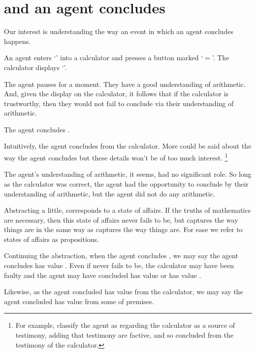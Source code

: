 \chapter{\qWhy{} and \qHow{} an agent concludes}
\label{cha:intro}

\begin{note}
  Our interest is understanding the way an event in which an agent concludes happens.

  \begin{scenario}[Calculation]%
    \label{scen:calc}%
    An agent enters `\gistCalcLHS{}' into a calculator and presses a button marked `\(=\)'.
    The calculator displays `\gistCalcRHS{}'.

    The agent pauses for a moment.
    They have a good understanding of arithmetic.
    And, given the display on the calculator, it follows that if the calculator is trustworthy, then they would not fail to conclude \propM{\gistCalcEq{}} via their understanding of arithmetic.

    The agent concludes \propM{\gistCalcEq{}}.
  \end{scenario}

  \noindent%
  Intuitively, the agent concludes \propM{\gistCalcEq{}} from the calculator.
  More could be said about the way the agent concludes but these details won't be of too much interest.%
  \footnote{
    For example, classify the agent as regarding the calculator as a source of testimony, adding that testimony are factive, and so concluded \propM{\gistCalcEq{}} from the testimony of the calculator.
  }

  The agent's understanding of arithmetic, it seems, had no significant role.
  So long as the calculator was correct, the agent had the opportunity to conclude \propM{\gistCalcEq{}} by their understanding of arithmetic, but the agent did not do any arithmetic.
\end{note}

\begin{note}
  Abstracting a little, \propM{\gistCalcEq{}} corresponds to a state of affairs.
  If the truths of mathematics are necessary, then this state of affairs never fails to be, but \propM{\gistCalcEq{}} captures the way things are in the same way as  captures the way things are.
  For ease we refer to states of affairs as propositions.

  Continuing the abstraction, when the agent concludes \propM{\gistCalcEq{}}, we may say the agent concludes \propM{\gistCalcEq{}} has value .
  Even if \propM{\gistCalcEq{}} never fails to be, the calculator may have been faulty and the agent may have concluded \propM{\gistCalcEqBad{}} has value  or \propM{\gistCalcEq{}} has value .

  Likewise, as the agent concluded \propM{\gistCalcEq{}} has value  from the calculator, we may say the agent concluded \propM{\gistCalcEq{}} has value  from some \pool{} of premises.
\end{note}

